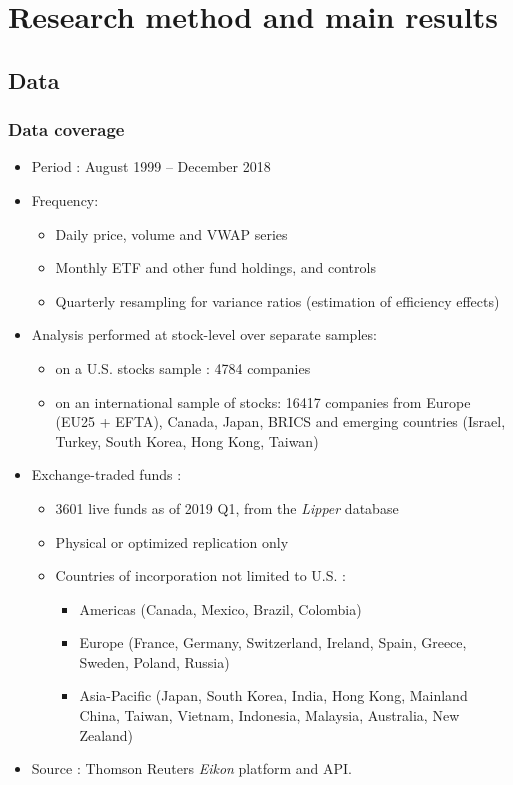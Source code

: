 \documentclass[handout, 9pt, usenames, dvipsnames]{beamer}
\begin{document}
\section{Research method and main results}
\subsection{Data}
\begin{frame}
  \frametitle{Data coverage}
  \begin{itemize}
  \item<1-> Period : August 1999 -- December 2018
  \item<2-> Frequency:
    \begin{itemize}
    \item Daily price, volume and VWAP series
    \item Monthly ETF and other fund holdings, and controls
    \item Quarterly resampling for variance ratios (estimation of efficiency effects)
    \end{itemize}
  \item<3-> Analysis performed at stock-level over separate samples:
    \begin{itemize}
    \item on a U.S. stocks sample : 4784 companies
    \item on an international sample of stocks: 16417 companies from Europe (EU25 + EFTA), Canada, Japan, BRICS and emerging countries (Israel, Turkey, South Korea, Hong Kong, Taiwan) 
    \end{itemize}
  \item<4-> Exchange-traded funds :
    \begin{itemize}
    \item 3601 live funds as of 2019 Q1, from the \textit{Lipper} database
    \item Physical or optimized replication only
    \item Countries of incorporation not limited to U.S. :
      \begin{itemize}
      \item Americas (Canada, Mexico, Brazil, Colombia)
      \item Europe (France, Germany, Switzerland, Ireland, Spain, Greece, Sweden, Poland, Russia)
      \item Asia-Pacific (Japan, South Korea, India, Hong Kong, Mainland China, Taiwan, Vietnam, Indonesia, Malaysia, Australia, New Zealand)
      \end{itemize}
    \end{itemize}
    \item<5-> Source : Thomson Reuters \emph{Eikon} platform and API. 
  \end{itemize}
  
\end{frame}
\end{document}
